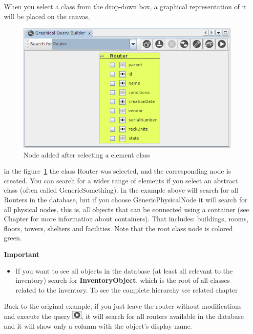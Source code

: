 \documentclass[a4paper]{article}
\begin{document}
	When you select a class from the drop-down box, a graphical representation of it will be placed on the canvas,
	\begin{figure}[h!]
		\centering
		\includegraphics[width=0.9\linewidth]{img/querying_node_added.png}
		\caption{Node added after selecting a element class}
		\label{fig:query_node_added}
	\end{figure}
	in the figure~\ref{fig:query_node_added} the class Router was selected, and the corresponding node is created. You can search for a wider range of elements if you select an abstract class (often called GenericSomething). In the example above will search for all Routers in the database, but if you choose GenericPhysicalNode it will search for all physical nodes, this is, all objects that can be connected using a container (see Chapter \textbf{} for more information about containers). That includes: buildings, rooms, floors, towers, shelters and facilities. Note that the root class node is colored green.
	
	\newpage
	\begin{framed} {\large \textbf{Important}}
		\begin{itemize}
			\item If you want to see all objects in the database (at least all relevant to the inventory) search for \textbf{InventoryObject}, which is the root of all classes related to the inventory. To see the complete hierarchy see related chapter \textbf{}
		\end{itemize}
	\end{framed}
	
	Back to the original example, if you just leave the router without modifications and execute the query \includegraphics[width=0.5cm]{img/icon_execute_query.png}, it will search for all routers available in the database and it will show only a column with the object's display name.				
	
\end{document}
